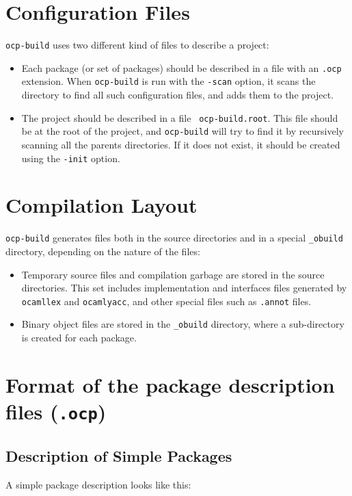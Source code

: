 \section{Configuration Files}

 {\tt ocp-build} uses two different kind of files to describe a project:
\begin{itemize}
\item Each package (or set of packages) should be described in a file
  with an {\tt .ocp} extension. When {\tt ocp-build} is run with the
  {\tt -scan} option, it scans the directory to find all such
  configuration files, and adds them to the project.
\item The project should be described in a file {\tt
  ocp-build.root}. This file should be at the root of the project, and
  {\tt ocp-build} will try to find it by recursively scanning all the
  parents directories. If it does not exist, it should be created using
  the {\tt -init} option.
\end{itemize}

\section{Compilation Layout}

{\tt ocp-build} generates files both in the source directories and in
a special {\tt \_obuild} directory, depending on the nature of the
files:
\begin{itemize}
\item Temporary source files and compilation garbage are stored in the
  source directories. This set includes implementation and interfaces
  files generated by {\tt ocamllex} and {\tt ocamlyacc}, and other
  special files such as {\tt .annot} files.
\item Binary object files are stored in the {\tt \_obuild} directory,
  where a sub-directory is created for each package.
\end{itemize}

\section{Format of the package description files ({\tt .ocp})}

\subsection{Description of Simple Packages}

A simple package description looks like this:

